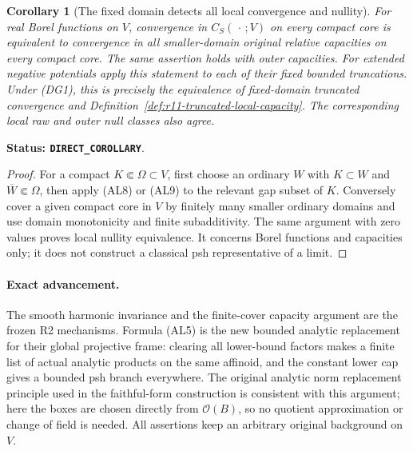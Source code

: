 \documentclass[11pt,a4paper]{article}
\numberwithin{equation}{section}
\newtheorem{corollary}[theorem]{Corollary}
\theoremstyle{definition}
\theoremstyle{remark}
\begin{document}
\begin{corollary}[The fixed domain detects all local convergence and nullity]
\label{cor:r11-affinoid-local-capacity-topology}
For real Borel functions on $V$, convergence in $C_S(\,\cdot\,;V)$
on every compact core is equivalent to convergence in all
smaller-domain original relative capacities on every compact
core. The same assertion holds with outer capacities.
For extended negative potentials apply this statement to
each of their fixed bounded truncations. Under (DG1), this
is precisely the equivalence of fixed-domain truncated
convergence and Definition~\ref{def:r11-truncated-local-capacity}.
The corresponding local raw and outer null classes also agree.
\end{corollary}

\noindent\textbf{Status: \texttt{DIRECT\_COROLLARY}}.

\begin{proof}
For a compact $K\Subset\Omega\subset V$, first choose an
ordinary $W$ with $K\subset W$ and $\overline W\Subset\Omega$,
then apply (AL8) or (AL9) to the relevant gap subset of $K$.
Conversely cover a given compact core in $V$ by finitely many
smaller ordinary domains and use domain monotonicity and
finite subadditivity. The same argument with zero values
proves local nullity equivalence. It concerns Borel functions
and capacities only; it does not construct a classical psh
representative of a limit.
\end{proof}

\paragraph{Exact advancement.}
The smooth harmonic invariance and the finite-cover capacity
argument are the frozen R2 mechanisms. Formula (AL5) is the
new bounded analytic replacement for their global projective
frame: clearing all lower-bound factors makes a finite list
of actual analytic products on the same affinoid, and the
constant lower cap gives a bounded psh branch everywhere.
The original analytic norm replacement principle used in the
faithful-form construction is consistent with this argument;
here the boxes are chosen directly from $\mathcal O(B)$, so
no quotient approximation or change of field is needed.
All assertions keep an arbitrary original background on $V$.



\end{document}
